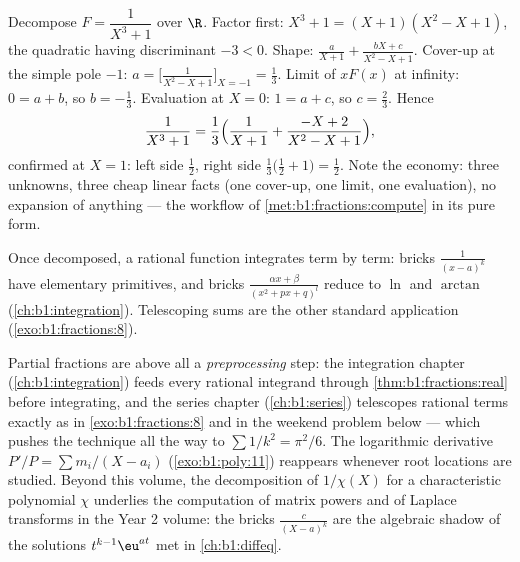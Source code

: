 \begin{example}\label{ex:b1:fractions:cubic}
Decompose $F = \dfrac{1}{X^3 + 1}$ over $\R$. Factor first: $X^3 +
1 = (X + 1)(X^2 - X + 1)$, the quadratic having discriminant $-3 <
0$. Shape: $\frac{a}{X+1} + \frac{bX + c}{X^2 - X + 1}$. Cover-up
at the simple pole $-1$: $a = \bigl[\frac1{X^2 - X +
1}\bigr]_{X=-1} = \frac13$. Limit of $xF(x)$ at infinity: $0 = a +
b$, so $b = -\frac13$. Evaluation at $X = 0$: $1 = a + c$, so $c =
\frac23$. Hence
\[
\frac{1}{X^3+1} = \frac13\Bigl(\frac{1}{X+1}
+ \frac{-X + 2}{X^2 - X + 1}\Bigr) ,
\]
confirmed at $X = 1$: left side $\frac12$, right side
$\frac13\bigl(\frac12 + 1\bigr) = \frac12$. Note the economy:
three unknowns, three cheap linear facts (one cover-up, one
limit, one evaluation), no expansion of anything --- the workflow
of \cref{met:b1:fractions:compute} in its pure form.
\end{example}

\begin{remark}
Once decomposed, a rational function integrates term by term: bricks
$\frac{1}{(x-a)^k}$ have elementary primitives, and bricks
$\frac{\alpha x + \beta}{(x^2 + px + q)^l}$ reduce to $\ln$ and
$\arctan$ (\cref{ch:b1:integration}). Telescoping sums are the other
standard application (\cref{exo:b1:fractions:8}).
\end{remark}

\begin{remark}\label{rem:b1:fractions:whereused}
Partial fractions are above all a \emph{preprocessing} step: the
integration chapter (\cref{ch:b1:integration}) feeds every rational
integrand through \cref{thm:b1:fractions:real} before integrating,
and the series chapter (\cref{ch:b1:series}) telescopes rational
terms exactly as in \cref{exo:b1:fractions:8} and in the weekend
problem below --- which pushes the technique all the way to
$\sum 1/k^2 = \pi^2/6$. The logarithmic derivative $P'/P = \sum
m_i/(X - a_i)$ (\cref{exo:b1:poly:11}) reappears whenever root
locations are studied. Beyond this volume, the decomposition of
$1/\chi(X)$ for a characteristic polynomial $\chi$ underlies the
computation of matrix powers and of Laplace transforms in the Year
2 volume: the bricks $\frac{c}{(X - a)^k}$ are the algebraic shadow
of the solutions $t^{k-1}\eu^{at}$ met in \cref{ch:b1:diffeq}.
\end{remark}

